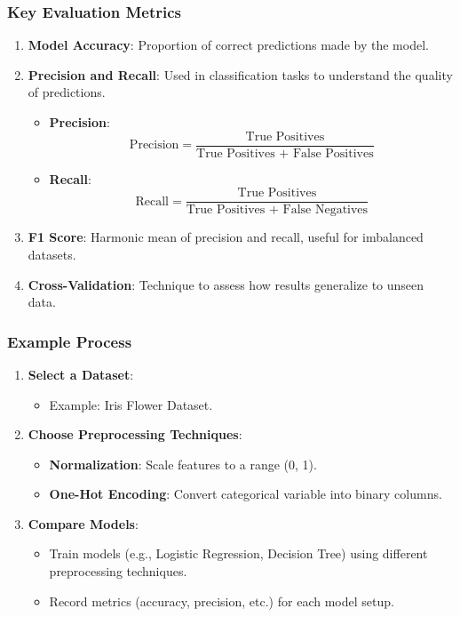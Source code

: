 \documentclass[aspectratio=169]{beamer}
\begin{document}
\begin{frame}[fragile]
    \frametitle{Key Evaluation Metrics}
    \begin{enumerate}
        \item \textbf{Model Accuracy}: Proportion of correct predictions made by the model.
        \item \textbf{Precision and Recall}: Used in classification tasks to understand the quality of predictions.
            \begin{itemize}
                \item \textbf{Precision}: 
                $$ \text{Precision} = \frac{\text{True Positives}}{\text{True Positives + False Positives}} $$
                \item \textbf{Recall}: 
                $$ \text{Recall} = \frac{\text{True Positives}}{\text{True Positives + False Negatives}} $$
            \end{itemize}
        \item \textbf{F1 Score}: Harmonic mean of precision and recall, useful for imbalanced datasets.
        \item \textbf{Cross-Validation}: Technique to assess how results generalize to unseen data.
    \end{enumerate}
\end{frame}

\begin{frame}[fragile]
    \frametitle{Example Process}
    \begin{enumerate}
        \item \textbf{Select a Dataset}:
            \begin{itemize}
                \item Example: Iris Flower Dataset.
            \end{itemize}
        \item \textbf{Choose Preprocessing Techniques}:
            \begin{itemize}
                \item \textbf{Normalization}: Scale features to a range (0, 1).
                \item \textbf{One-Hot Encoding}: Convert categorical variable into binary columns.
            \end{itemize}
        \item \textbf{Compare Models}:
            \begin{itemize}
                \item Train models (e.g., Logistic Regression, Decision Tree) using different preprocessing techniques.
                \item Record metrics (accuracy, precision, etc.) for each model setup.
            \end{itemize}
    \end{enumerate}
\end{frame}
\end{document}

